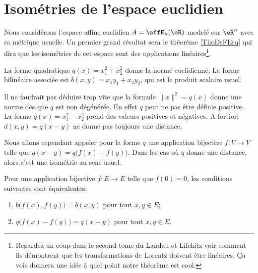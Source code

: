 \section{Isométries de l'espace euclidien}

Nous considérons l'espace affine euclidien \( A=\affE_n(\eR)\) modelé sur \( \eR^n\) avec sa métrique usuelle. Un premier grand résultat sera le théorème \ref{ThoDsFErq} qui dira que les isométries de cet espace sont des applications linéaires\footnote{Regardez un coup dans le second tome du Landau et Lifchitz voir comment ils démontrent que les transformations de Lorentz doivent être linéaires. Ça vois donnera une idée à quel point notre théorème est cool.}.

\begin{example}
    La forme quadratique \( q(x)=x_1^2+x_2^2\) donne la norme euclidienne. La forme bilinéaire associée est \( b(x,y)=x_1y_1+x_2y_2\), qui est le produit scalaire usuel.
\end{example}

Il ne faudrait pas déduire trop vite que la formule \( \| x \|^2=q(x)\) donne une norme dès que \( q\) est non dégénérée. En effet \( q\) peut ne pas être définie positive. La forme \( q(x)=x_1^2-x_2^2\) prend des valeurs positives et négatives. A fortiori \( d(x,y)=q(x-y)\) ne donne pas toujours une distance.

Nous allons cependant appeler  pour la forme \( q\) une application bijective \( f\colon V\to V\) telle que \( q(x-y)=q\big( f(x)-f(y) \big)\). Dans les cas où \( q\) donne une distance, alors c'est une isométrie au sens usuel.

\begin{lemma}   \label{LemewGJmM}
    Pour une application bijective \( f\colon E\to E\) telle que \( f(0)=0\), les conditions suivantes sont équivalentes: 
    \begin{enumerate}
        \item
            \( b\big( f(x),f(y) \big)=b(x,y)\) pour tout \( x,y\in E\);
        \item
            \( q\big( f(x)-f(y) \big)=q(x-y)\) pour tout \( x,y\in E\).
    \end{enumerate}
\end{lemma}


